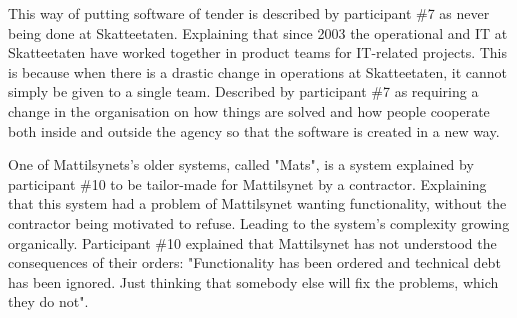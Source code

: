
This way of putting software of tender is described by participant \#7 as never being done at Skatteetaten. Explaining that since 2003 the operational and IT at Skatteetaten have worked together in product teams for IT-related projects. This is because when there is a drastic change in operations at Skatteetaten, it cannot simply be given to a single team. Described by participant \#7 as requiring a change in the organisation on how things are solved and how people cooperate both inside and outside the agency so that the software is created in a new way.



One of Mattilsynets's older systems, called "Mats", is a system explained by participant \#10 to be tailor-made for Mattilsynet by a contractor. Explaining that this system had a problem of Mattilsynet wanting functionality, without the contractor being motivated to refuse. Leading to the system's complexity growing organically. Participant \#10 explained that Mattilsynet has not understood the consequences of their orders: "Functionality has been ordered and technical debt has been ignored. Just thinking that somebody else will fix the problems, which they do not".

